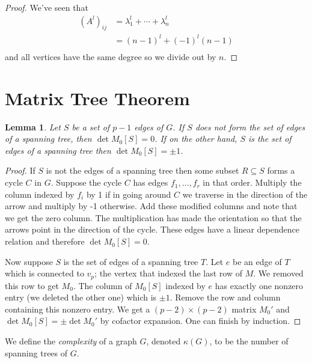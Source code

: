 \documentclass[10pt, letterpaper]{article}
\newtheorem{lemma}{Lemma}
\theoremstyle{remark}
\theoremstyle{definition}
\begin{document}
    \begin{proof}
        We've seen that
        \begin{align*}
            (A^l)_{ij} &= \lambda_1^l + \cdots + \lambda_n^l \\
                       &= (n-1)^l + (-1)^l(n-1) \\
        \end{align*}
        and all vertices have the same degree so we divide out by $n$.
    \end{proof}

    \section{Matrix Tree Theorem}

    \begin{lemma}
        Let $S$ be a set of $p-1$ edges of $G$. If $S$ does not form the set of edges of a spanning tree, then $\det M_0[S]=0$.
        If on the other hand, $S$ is the set of edges of a spanning tree then $\det M_0[S] = \pm 1$.
    \end{lemma}

    \begin{proof}
        If $S$ is not the edges of a spanning tree then some subset $R \subseteq S$ forms a cycle $C$ in $G$. Suppose the
        cycle $C$ has edges $f_1, \ldots, f_r$ in that order. Multiply the column indexed by $f_i$ by 1 if in going around
        $C$ we traverse in the direction of the arrow and multiply by -1 otherwise. Add these modified columns and note
        that we get the zero column. The multiplication has made the orientation so that the arrows point in the direction
        of the cycle. These edges have a linear dependence relation and therefore $\det M_0[S]=0$.

        Now suppose $S$ is the set of edges of a spanning tree $T$. Let $e$ be an edge of $T$ which is connected to $v_p$;
        the vertex that indexed the last row of $M$. We removed this row to get $M_0$. The column of $M_0[S]$ indexed by $e$
        has exactly one nonzero entry (we deleted the other one) which is $\pm 1$. Remove the row and column containing this
        nonzero entry. We get a $(p-2) \times (p-2)$ matrix $M_0'$ and  $\det M_0[S] = \pm \det M_0'$ by cofactor expansion.
        One can finish by induction.
    \end{proof}

    We define the \textit{complexity} of a graph $G$, denoted $\kappa(G)$, to be the number of spanning trees of $G$.
\end{document}
